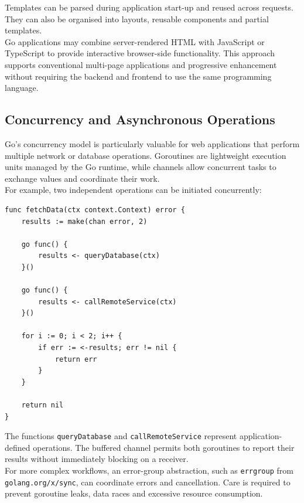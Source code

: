 Templates can be parsed during application start-up and reused across requests. They can also be organised into layouts, reusable components and partial templates.\\

Go applications may combine server-rendered HTML with JavaScript or TypeScript to provide interactive browser-side functionality. This approach supports conventional multi-page applications and progressive enhancement without requiring the backend and frontend to use the same programming language.\\

\subsection{Concurrency and Asynchronous Operations}

Go's concurrency model is particularly valuable for web applications that perform multiple network or database operations. Goroutines are lightweight execution units managed by the Go runtime, while channels allow concurrent tasks to exchange values and coordinate their work.\\

For example, two independent operations can be initiated concurrently:

\begin{lstlisting}
func fetchData(ctx context.Context) error {
    results := make(chan error, 2)

    go func() {
        results <- queryDatabase(ctx)
    }()

    go func() {
        results <- callRemoteService(ctx)
    }()

    for i := 0; i < 2; i++ {
        if err := <-results; err != nil {
            return err
        }
    }

    return nil
}
\end{lstlisting}

The functions \texttt{queryDatabase} and \texttt{callRemoteService} represent application-defined operations. The buffered channel permits both goroutines to report their results without immediately blocking on a receiver.\\

For more complex workflows, an error-group abstraction, such as \texttt{errgroup} from \texttt{golang.org/x/sync}, can coordinate errors and cancellation. Care is required to prevent goroutine leaks, data races and excessive resource consumption.\\

